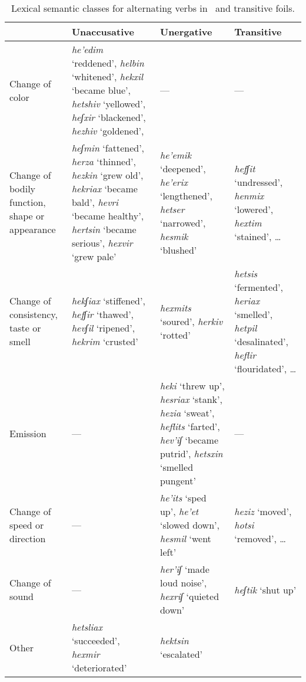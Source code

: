 \begin{table}[ht] \small \centering \singlespacing
	\begin{tabular}{|p{3cm}||p{4.5cm}|p{4.5cm}||p{3cm}|}\hline
		&	Unaccusative	&  Unergative & Transitive \\\hline\hline
	Change of color & \emph{he'edim} `reddened', \emph{helbin} `whitened', \emph{hekxil} `became blue', \emph{hetshiv} `yellowed', \emph{heʃxir} `blackened', \emph{hezhiv} `goldened', 
		& --- & --- \\\hline
	
	Change of bodily function, shape or appearance & \emph{heʃmin} `fattened', \emph{herza} `thinned', \emph{hezkin} `grew old', \emph{hekriax} `became bald', \emph{hevri} `became healthy', \emph{hertsin} `became serious', \emph{hexvir} `grew pale' &
		\emph{he'emik} `deepened', \emph{he'erix} `lengthened', \emph{hetser} `narrowed', \emph{hesmik} `blushed' & \emph{hefʃit} `undressed', \emph{henmix} `lowered', \emph{hextim} `stained', \dots \\\hline

	Change of consistency, taste or smell & \emph{hekʃiax} `stiffened', \emph{hefʃir} `thawed', \emph{hevʃil} `ripened', \emph{hekrim} `crusted'
		& \emph{hexmits} `soured', \emph{herkiv} `rotted'
		& \emph{hetsis} `fermented', \emph{heriax} `smelled', \emph{hetpil} `desalinated', \emph{heflir} `flouridated', \dots \\\hline
	
	Emission & --- & \emph{heki} `threw up', \emph{hesriax} `stank', \emph{hezia} `sweat', \emph{heflits} `farted', \emph{hev'iʃ} `became putrid', \emph{hetsxin} `smelled pungent' & --- \\\hline
	
	Change of speed or direction & --- & \emph{he'its} `sped up', \emph{he'et} `slowed down', \emph{hesmil} `went left' & \emph{heziz} `moved', \emph{hotsi} `removed', \dots \\\hline
	
	Change of sound & --- & \emph{her'iʃ} `made loud noise', \emph{hexriʃ} `quieted down' & \emph{heʃtik} `shut up' \\\hline
	
	Other & \emph{hetsliax} `succeeded', \emph{hexmir} `deteriorated' & \emph{hektsin} `escalated' &  \\\hline
	\end{tabular}
\caption{Lexical semantic classes for alternating verbs in \thif~and transitive foils.\label{table:thif-roots}}
\end{table}


